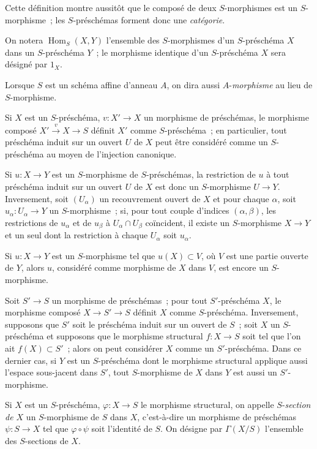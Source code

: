 Cette définition montre aussitôt que le composé de deux $S$-morphismes est un
$S$-morphisme~; les $S$-préschémas forment donc une \emph{catégorie}.

On notera $\operatorname{Hom}_S(X,Y)$ l'ensemble des $S$-morphismes d'un
$S$-préschéma $X$ dans un $S$-préschéma $Y$~; le morphisme identique d'un
$S$-préschéma $X$ sera désigné par $1_X$.

Lorsque $S$ est un schéma affine d'anneau $A$, on dira aussi
$A$-\emph{morphisme} au lieu de $S$-morphisme.

\begin{env}[2.5.3]
\label{I.2.5.3-fr}
Si $X$ est un $S$-préschéma, $v:X'\to X$ un morphisme de préschémas, le
morphisme composé $X'\xrightarrow{v}X\to S$ définit $X'$ comme
$S$-préschéma~; en particulier, tout préschéma induit sur un ouvert $U$ de
$X$ peut être considéré comme un $S$-préschéma au moyen de l'injection
canonique.

Si $u:X\to Y$ est un $S$-morphisme de $S$-préschémas, la restriction de $u$
à tout préschéma induit sur un ouvert $U$ de $X$ est donc un $S$-morphisme
$U\to Y$. Inversement, soit $(U_\alpha)$ un recouvrement ouvert de $X$ et pour
chaque $\alpha$, soit $u_\alpha:U_\alpha\to Y$ un $S$-morphisme~; si, pour tout
couple d'indices $(\alpha,\beta)$, les restrictions de $u_\alpha$ et de
$u_\beta$ à $U_\alpha\cap U_\beta$ coïncident, il existe un $S$-morphisme
$X\to Y$ et un seul dont la restriction à chaque $U_\alpha$ soit $u_\alpha$.

Si $u:X\to Y$ est un $S$-morphisme tel que $u(X)\subset V$, où $V$ est une
partie ouverte de $Y$, alors $u$, considéré comme morphisme de $X$ dans $V$,
est encore un $S$-morphisme.
\end{env}

\begin{env}[2.5.4]
\label{I.2.5.4-fr}
Soit $S'\to S$ un morphisme de préschémas~; pour tout $S'$-préschéma $X$, le
morphisme composé $X\to S'\to S$ définit $X$ comme $S$-préschéma.
Inversement, supposons que $S'$ soit le préschéma induit sur un ouvert de
$S$~; soit $X$ un $S$-préschéma et supposons que le morphisme structural
$f:X\to S$ soit tel que l'on ait $f(X)\subset S'$~; alors on peut considérer
$X$ comme un $S'$-préschéma. Dans ce dernier cas, si $Y$ est un $S$-préschéma
dont le morphisme structural applique aussi l'espace sous-jacent dans $S'$,
tout $S$-morphisme de $X$ dans $Y$ est aussi un $S'$-morphisme.
\end{env}

\begin{env}[2.5.5]
\label{I.2.5.5-fr}
Si $X$ est un $S$-préschéma, $\varphi:X\to S$ le morphisme structural, on
appelle $S$-\emph{section de $X$} un $S$-morphisme de $S$ dans $X$,
c'est-à-dire un morphisme de préschémas $\psi:S\to X$ tel que
$\varphi\circ\psi$ soit l'identité de $S$. On désigne par $\Gamma(X/S)$
l'ensemble des $S$-sections de $X$.
\end{env}
